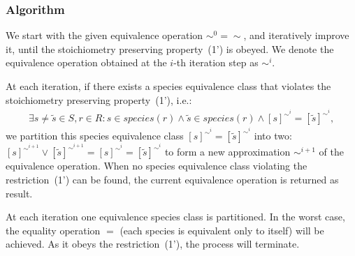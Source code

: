 \documentclass[9pt]{article}
\newcounter{rm}
\begin{document}
\subsubsection*{Algorithm}
We start with the given equivalence operation $\sim^0 = \sim$, and iteratively improve it, until the stoichiometry preserving property~(1') is obeyed. We denote the equivalence operation obtained at the $i$-th iteration step as $\sim^i$.

At each iteration, if there exists a species equivalence class that violates the stoichiometry preserving property~(1'), i.e.:
\[ \begin{array}{l}
\mbox{$\exists s \neq \tilde{s} \in S, r \in R: s \in species(r) \land \tilde{s} \in species(r) \land  [s]^{{\sim}^i} = [\tilde{s}]^{{\sim}^i}$}, 
\end{array} \]
we partition this species equivalence class $[s]^{{\sim}^i} = [\tilde{s}]^{{\sim}^i}$ into two: $[s]^{{\sim}^{i+1}}  \vee [\tilde{s}]^{{\sim}^{i+1}}  = [s]^{{\sim}^i} = [\tilde{s}]^{{\sim}^i} $ to form a new approximation ${\sim}^{i+1}$ of the equivalence operation. When no species equivalence class violating the restriction~(1') can be found, the current equivalence operation is returned as result.

At each iteration one equivalence species class is partitioned. In the worst case, the equality operation $=$ (each species is equivalent only to itself) will be achieved. As it obeys the restriction~(1'), the process will terminate. \\
\end{document}
